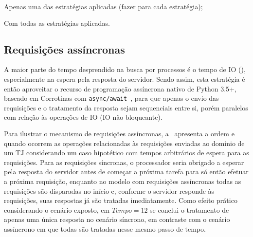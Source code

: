 
\begin{todolist}
    \item Apenas uma das estratégias aplicadas (fazer para cada estratégia);
    \item Com todas as estratégias aplicadas.
\end{todolist}

\subsection{Requisições assíncronas}

A maior parte do tempo desprendido na busca por processos é o tempo de IO
(), especialmente na espera pela resposta do
servidor. Sendo assim, esta estratégia é então aproveitar o recurso de
programação assíncrona nativo de Python 3.5+, baseado em Corrotinas com
\texttt{async/await}~\cite{spec:pep0492}, para que apenas o envio das
requisições e o tratamento da resposta sejam sequenciais entre si, porém
paralelos com relação às operações de IO (IO não-bloqueante).

Para ilustrar o mecanismo de requisições assíncronas,
a~ apresenta a ordem e quando ocorrem
as operações relacionadas às requisições enviadas ao domínio de um TJ
considerando um caso hipotético com tempos arbitrários de espera para as
requisições. Para as requisições síncronas, o processador seria obrigado a
esperar pela resposta do servidor antes de começar a próxima tarefa para só
então efetuar a próxima requisição, enquanto no modelo com requisições
assíncronas todas as requisições são disparadas no início e, conforme o
servidor responde às requisições, suas respostas já são tratadas imediatamente.
Como efeito prático considerando o cenário exposto, em $Tempo = 12$ se conclui
o tratamento de apenas uma única resposta no cenário síncrono, em contraste com
o cenário assíncrono em que todas são tratadas nesse mesmo passo de tempo.

